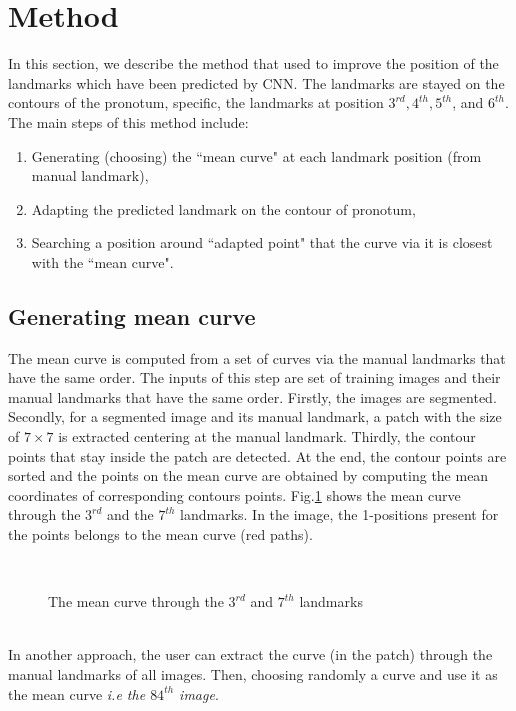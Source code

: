\documentclass[12pt,a4paper]{article}
\begin{document}
\section{Method}
In this section, we describe the method that used to improve the position of the landmarks which have been predicted by CNN. The landmarks are stayed on the contours of the pronotum, specific, the landmarks at position $3^{rd}, 4^{th}, 5^{th}$, and $6^{th}$. The main steps of this method include:
\begin{enumerate}
	\item Generating (choosing) the ``mean curve" at each landmark position (from manual landmark),
	\item Adapting the predicted landmark on the contour of pronotum,
	\item Searching a position around ``adapted point" that the curve via it is closest with the ``mean curve".
\end{enumerate}
\subsection*{Generating mean curve}
The mean curve is computed from a set of curves via the manual landmarks that have the same order. The inputs of this step are set of training images and their manual landmarks that have the same order. Firstly, the images are segmented. Secondly, for a segmented image and its manual landmark, a patch with the size of $7 \times 7$ is extracted centering at the manual landmark. Thirdly, the contour points that stay inside the patch are detected. At the end, the contour points are sorted and the points on the mean curve are obtained by computing the mean coordinates of corresponding contours points. Fig.\ref{meancuvre} shows the mean curve through the $3^{rd}$ and the $7^{th}$ landmarks. In the image, the 1-positions present for the points belongs to the mean curve (red paths). 
\begin{figure}[h!]
\centering
{}~~
\caption{The mean curve through the $3^{rd}$ and $7^{th}$ landmarks}
\label{meancuvre}
\end{figure}~\\
In another approach, the user can extract the curve (in the patch) through the manual landmarks of all images. Then, choosing randomly a curve and use it as the mean curve \textit{i.e the $84^{th}$ image}.
\end{document}
